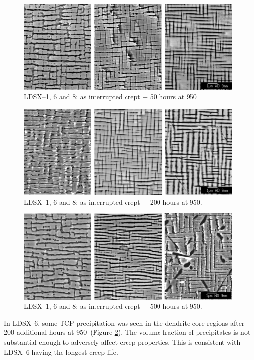 %
\begin{figure}[hp]
\begin{center}
\includegraphics{LDSXInterrupted_50}
\caption{LDSX--1, 6 and 8: as interrupted crept + 50 hours at 950\celsius}\label{fig:LDSXInterrupted_50}
\end{center}
\end{figure} 
%
\begin{figure}[hp]
\begin{center}
\includegraphics{LDSXInterrupted_200}
\caption{LDSX--1, 6 and 8: as interrupted crept + 200 hours at 950\celsius. }\label{fig:LDSXInterrupted_200}
\end{center}
\end{figure} 
%
\begin{figure}[hp]
\begin{center}
\includegraphics{LDSXInterrupted_500}
\caption{LDSX--1, 6 and 8: as interrupted crept + 500 hours at 950\celsius.}\label{fig:LDSXInterrupted_500}
\end{center}
\end{figure}
%
In LDSX--6, some TCP precipitation was seen in the dendrite core regions after 200 additional hours at 950\celsius\ (Figure \ref{fig:LDSXInterrupted_200}).  The volume fraction of precipitates is not substantial enough to adversely affect creep properties.  This is consistent with LDSX--6 having the longest creep life.  

